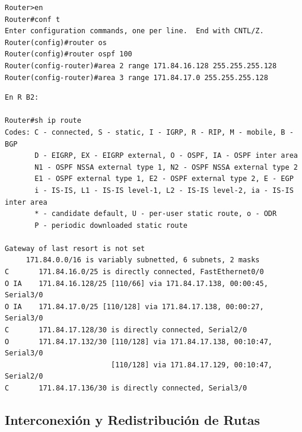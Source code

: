 \documentclass[twoside, 11pt]{article}
\begin{document}
\begin{enumerate}
\begin{center}
\begin{verbatim}
Router>en
Router#conf t
Enter configuration commands, one per line.  End with CNTL/Z.
Router(config)#router os
Router(config)#router ospf 100
Router(config-router)#area 2 range 171.84.16.128 255.255.255.128
Router(config-router)#area 3 range 171.84.17.0 255.255.255.128
\end{verbatim}
\label{list:2.1.2.10.3}

\begin{verbatim}
En R B2:

Router#sh ip route
Codes: C - connected, S - static, I - IGRP, R - RIP, M - mobile, B - BGP
       D - EIGRP, EX - EIGRP external, O - OSPF, IA - OSPF inter area
       N1 - OSPF NSSA external type 1, N2 - OSPF NSSA external type 2
       E1 - OSPF external type 1, E2 - OSPF external type 2, E - EGP
       i - IS-IS, L1 - IS-IS level-1, L2 - IS-IS level-2, ia - IS-IS inter area
       * - candidate default, U - per-user static route, o - ODR
       P - periodic downloaded static route

Gateway of last resort is not set
     171.84.0.0/16 is variably subnetted, 6 subnets, 2 masks
C       171.84.16.0/25 is directly connected, FastEthernet0/0
O IA    171.84.16.128/25 [110/66] via 171.84.17.138, 00:00:45, Serial3/0
O IA    171.84.17.0/25 [110/128] via 171.84.17.138, 00:00:27, Serial3/0
C       171.84.17.128/30 is directly connected, Serial2/0
O       171.84.17.132/30 [110/128] via 171.84.17.138, 00:10:47, Serial3/0
                         [110/128] via 171.84.17.129, 00:10:47, Serial2/0
C       171.84.17.136/30 is directly connected, Serial3/0
\end{verbatim}
\label{list:2.1.2.10.4}
\end{center}
\clearpage

\end{enumerate}

\subsection{Interconexión y Redistribución de Rutas}
\end{document}
